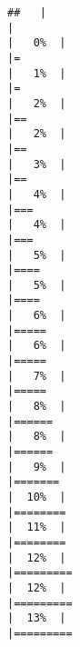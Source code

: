 \documentclass[
]{article}
\begin{document}
\begin{verbatim}
##   |                                                                              |                                                                      |   0%  |                                                                              |=                                                                     |   1%  |                                                                              |=                                                                     |   2%  |                                                                              |==                                                                    |   2%  |                                                                              |==                                                                    |   3%  |                                                                              |==                                                                    |   4%  |                                                                              |===                                                                   |   4%  |                                                                              |===                                                                   |   5%  |                                                                              |====                                                                  |   5%  |                                                                              |====                                                                  |   6%  |                                                                              |=====                                                                 |   6%  |                                                                              |=====                                                                 |   7%  |                                                                              |=====                                                                 |   8%  |                                                                              |======                                                                |   8%  |                                                                              |======                                                                |   9%  |                                                                              |=======                                                               |  10%  |                                                                              |========                                                              |  11%  |                                                                              |========                                                              |  12%  |                                                                              |=========                                                             |  12%  |                                                                              |=========                                                             |  13%  |                                                                              |========= 
\end{verbatim}
\end{document}
